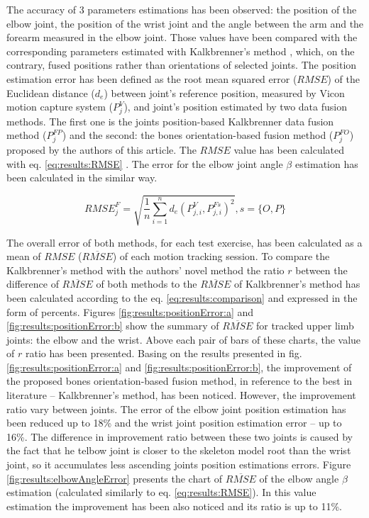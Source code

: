 \documentclass[sensors,article,submit,moreauthors,pdftex,10pt,a4paper]{mdpi}
\begin{document}
	The accuracy of 3 parameters estimations has been observed: the position of the elbow joint, the position of the wrist joint and the angle between the arm and the forearm measured in the elbow joint. Those values have been compared with the corresponding parameters estimated with Kalkbrenner’s method \cite{Kalkbrenner2014}, which, on the contrary, fused positions rather than orientations of selected joints. The position estimation error has been defined as the root mean squared error ($RMSE$) of the Euclidean distance ($d_e$) between joint’s reference position, measured by Vicon motion capture system ($P_j^V$), and joint’s position estimated by two data fusion methods. The first one is the joints position-based Kalkbrenner data fusion method ($P_j^{FP}$) and the second: the bones orientation-based fusion method ($P_j^{FO}$) proposed by the authors of this article. The $RMSE$ value has been calculated with eq. \ref{eq:results:RMSE} \cite{Armstrong1992}. The error for the elbow joint angle $\beta$ estimation has been calculated in the similar way.
		
	\begin{equation}
		{RMSE}^F_j = \sqrt{\frac{1}{n}\sum_{i=1}^{n}{d_e(P^V_{j,i}, P^{Fs}_{j,i})^2}} , s = \{O,P\}
		\label{eq:results:RMSE}
	\end{equation}
		
	The overall error of both methods, for each test exercise, has been calculated as a mean of $RMSE$ ($\overline{RMSE}$) of each motion tracking session. To compare the Kalkbrenner’s method with the authors’ novel method the ratio $r$ between the difference of $\overline{RMSE}$ of both methods to the $\overline{RMSE}$ of Kalkbrenner’s method has been calculated according to the eq. \ref{eq:results:comparison} and expressed in the form of percents. Figures \ref{fig:results:positionError:a} and \ref{fig:results:positionError:b} show the summary of  $\overline{RMSE}$ for tracked upper limb joints: the elbow and the wrist. Above each pair of bars of these charts, the value of $r$ ratio has been presented. Basing on the results presented in fig. \ref{fig:results:positionError:a} and \ref{fig:results:positionError:b}, the improvement of the proposed bones orientation-based fusion method, in reference to the best in literature -- Kalkbrenner’s method, has been noticed. However, the improvement ratio vary between joints. The error of the elbow joint position estimation has been reduced up to 18\% and the wrist joint position estimation error -- up to 16\%. The difference in improvement ratio between these two joints is caused by the fact that he telbow joint is closer to the skeleton model root than the wrist joint, so it accumulates less ascending joints position estimations errors. Figure \ref{fig:results:elbowAngleError} presents the chart of $\overline{RMSE}$ of the elbow angle $\beta$ estimation (calculated similarly to eq. \ref{eq:results:RMSE}). In this value estimation the improvement has been also noticed and its ratio is up to 11\%.
		
\end{document}
